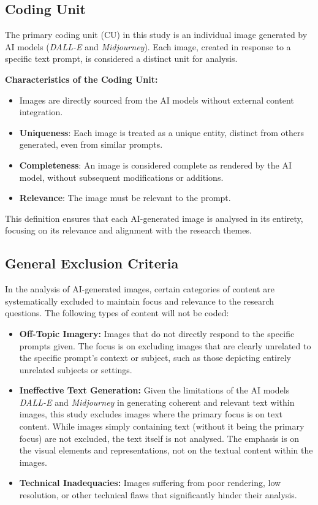\subsection{Coding Unit}
The primary coding unit (CU) in this study is an individual image generated by AI models (\textit{DALL-E} and \textit{Midjourney}). Each image, created in response to a specific text prompt, is considered a distinct unit for analysis.

\textbf{Characteristics of the Coding Unit:
}
\begin{itemize}
    \item Images are directly sourced from the AI models without external content integration.
    \item \textbf{Uniqueness}: Each image is treated as a unique entity, distinct from others generated, even from similar prompts.
    \item \textbf{Completeness}: An image is considered complete as rendered by the AI model, without subsequent modifications or additions.
    \item \textbf{Relevance}: The image must be relevant to the prompt.
\end{itemize}

This definition ensures that each AI-generated image is analysed in its entirety, focusing on its relevance and alignment with the research themes.

\subsection{General Exclusion Criteria}
In the analysis of AI-generated images, certain categories of content are systematically excluded to maintain focus and relevance to the research questions. The following types of content will not be coded:

\begin{itemize}
    \item \textbf{Off-Topic Imagery:} Images that do not directly respond to the specific prompts given. The focus is on excluding images that are clearly unrelated to the specific prompt's context or subject, such as those depicting entirely unrelated subjects or settings.
    \item \textbf{Ineffective Text Generation:} Given the limitations of the AI models \textit{DALL-E} and \textit{Midjourney} in generating coherent and relevant text within images, this study excludes images where the primary focus is on text content. While images simply containing text (without it being the primary focus) are not excluded, the text itself is not analysed. The emphasis is on the visual elements and representations, not on the textual content within the images.
    \item \textbf{Technical Inadequacies:} Images suffering from poor rendering, low resolution, or other technical flaws that significantly hinder their analysis.
\end{itemize}


